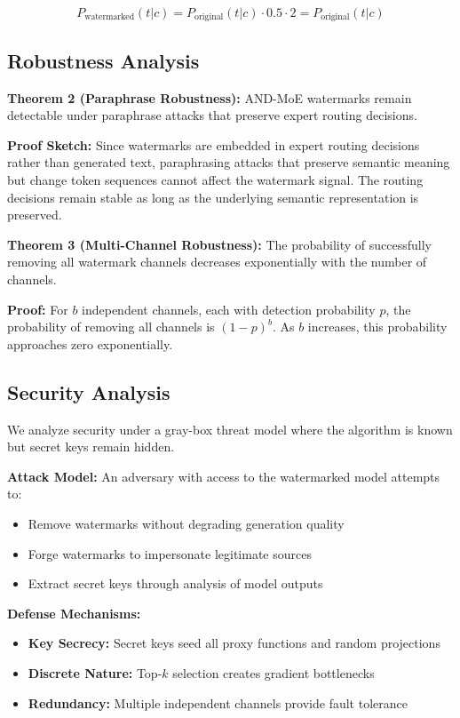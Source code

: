 \documentclass[letterpaper,twocolumn,10pt]{article}
\begin{document}
\begin{equation}
P_{\text{watermarked}}(t|c) = P_{\text{original}}(t|c) \cdot 0.5 \cdot 2 = P_{\text{original}}(t|c)
\end{equation}

\subsection{Robustness Analysis}

\textbf{Theorem 2 (Paraphrase Robustness):} AND-MoE watermarks remain detectable under paraphrase attacks that preserve expert routing decisions.

\textbf{Proof Sketch:} Since watermarks are embedded in expert routing decisions rather than generated text, paraphrasing attacks that preserve semantic meaning but change token sequences cannot affect the watermark signal. The routing decisions remain stable as long as the underlying semantic representation is preserved.

\textbf{Theorem 3 (Multi-Channel Robustness):} The probability of successfully removing all watermark channels decreases exponentially with the number of channels.

\textbf{Proof:} For $b$ independent channels, each with detection probability $p$, the probability of removing all channels is $(1-p)^b$. As $b$ increases, this probability approaches zero exponentially.

\subsection{Security Analysis}

We analyze security under a gray-box threat model where the algorithm is known but secret keys remain hidden.

\textbf{Attack Model:} An adversary with access to the watermarked model attempts to:
\begin{itemize}
\item Remove watermarks without degrading generation quality
\item Forge watermarks to impersonate legitimate sources
\item Extract secret keys through analysis of model outputs
\end{itemize}

\textbf{Defense Mechanisms:}
\begin{itemize}
\item \textbf{Key Secrecy:} Secret keys seed all proxy functions and random projections
\item \textbf{Discrete Nature:} Top-$k$ selection creates gradient bottlenecks
\item \textbf{Redundancy:} Multiple independent channels provide fault tolerance
\end{itemize}
\end{document}
